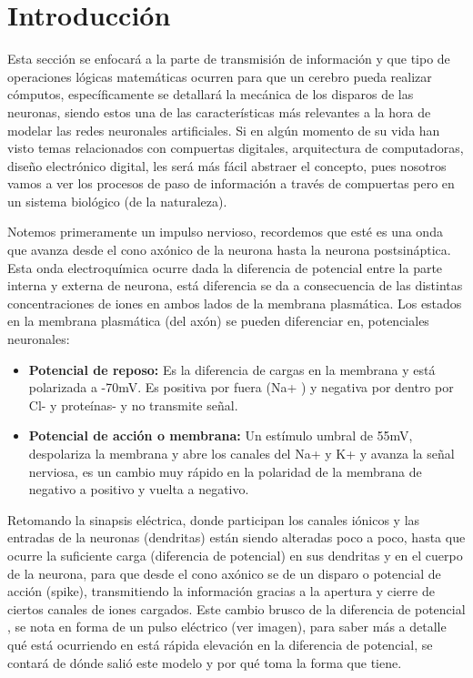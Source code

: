 \section{Introducción}
Esta sección se enfocará a la parte de transmisión de información y que tipo de operaciones lógicas matemáticas ocurren para que un cerebro pueda realizar cómputos, específicamente se detallará la mecánica de los disparos de las neuronas, siendo estos una de las características más relevantes a la hora de modelar las redes neuronales artificiales. Si en algún momento de su vida han visto temas relacionados con compuertas digitales, arquitectura de computadoras, diseño electrónico digital, les será más fácil abstraer el concepto, pues nosotros vamos a ver los procesos de paso de información a través de compuertas pero en un sistema biológico (de la naturaleza). 

Notemos primeramente un impulso nervioso, recordemos que esté es una onda que avanza desde el cono axónico de la neurona hasta la neurona postsináptica. Esta onda electroquímica ocurre dada la diferencia de potencial entre la parte interna y externa de neurona, está diferencia se da a consecuencia de las distintas concentraciones de iones en ambos lados de la membrana plasmática. Los estados en la membrana plasmática (del axón) se pueden diferenciar en, potenciales neuronales:

\begin{itemize}
\item \textbf{Potencial de reposo:} Es la diferencia de cargas en la membrana y está polarizada a -70mV. Es positiva por fuera (Na+ ) y negativa por dentro por Cl- y proteínas- y no transmite señal. 
\item \textbf{Potencial de acción o membrana:} Un estímulo umbral de 55mV, despolariza la membrana y abre los canales del Na+ y K+ y avanza la señal nerviosa, es un cambio muy rápido en la polaridad de la membrana de negativo a positivo y vuelta a negativo.
\end{itemize}

Retomando la sinapsis eléctrica, donde participan los canales iónicos y las entradas de la neuronas (dendritas) están siendo alteradas poco a poco, hasta que ocurre la suficiente carga (diferencia de potencial) en sus dendritas y en el cuerpo de la neurona, para que desde el cono axónico se de un disparo o potencial de acción (spike), transmitiendo la información gracias a la apertura y cierre de ciertos canales de iones cargados. Este cambio brusco de la diferencia de potencial , se nota en forma de un pulso eléctrico (ver imagen),  para saber más a detalle qué está ocurriendo en está rápida elevación en la diferencia de potencial, se contará de dónde salió este modelo y por qué toma la forma que tiene. 

